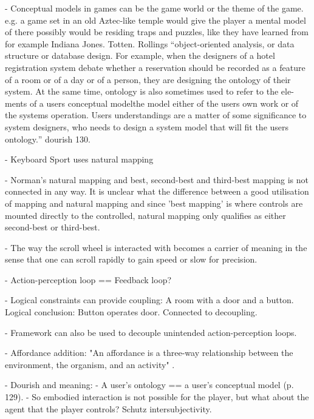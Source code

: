 - Conceptual models in games can be the game world or the theme of the game. e.g. a game set in an old Aztec-like temple would give the player a mental model of there possibly would be residing traps and puzzles, like they have learned from for example Indiana Jones. Totten. Rollings
``object-oriented analysis, or data structure or database design.
For example, when the designers of a hotel registration system debate
whether a reservation should be recorded as a feature of a room or of a
day or of a person, they are designing the ontology of their system. At
the same time, ontology is also sometimes used to refer to the ele-
ments of a users conceptual modelthe model either of the users own
work or of the systems operation. Users understandings are a matter of
some significance to system designers, who needs to design a system
model that will fit the users ontology.'' dourish 130.

- Keyboard Sport uses natural mapping

- Norman's natural mapping and best, second-best and third-best mapping is not connected in any way. It is unclear what the difference between a good utilisation of mapping and natural mapping and since 'best mapping' is where controls are mounted directly to the controlled, natural mapping only qualifies as either second-best or third-best.

- The way the scroll wheel is interacted with becomes a carrier of meaning in the sense that one can scroll rapidly to gain speed or slow for precision.

- Action-perception loop == Feedback loop?

- Logical constraints can provide coupling: A room with a door and a button. Logical conclusion: Button operates door. Connected to decoupling.

- Framework can also be used to decouple unintended action-perception loops.

 - Affordance addition: "An affordance is a three-way relationship between the environment, the organism, and an activity" \cite[p. 118]{dourish}.

 - Dourish and meaning:
  - A user's ontology == a user's conceptual model (p. 129).
  - So embodied interaction is not possible for the player, but what about the agent that the player controls? Schutz intersubjectivity.
